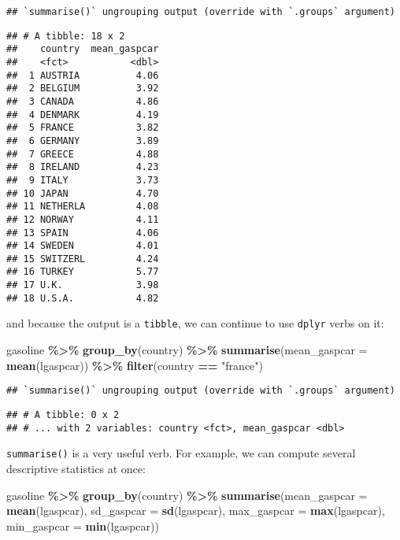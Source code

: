 \documentclass[
]{article}
\newenvironment{Shaded}{\begin{snugshade}}{\end{snugshade}}
\newcommand{\DataTypeTok}[1]{\textcolor[rgb]{0.13,0.29,0.53}{#1}}
\newcommand{\KeywordTok}[1]{\textcolor[rgb]{0.13,0.29,0.53}{\textbf{#1}}}
\newcommand{\NormalTok}[1]{#1}
\newcommand{\OperatorTok}[1]{\textcolor[rgb]{0.81,0.36,0.00}{\textbf{#1}}}
\newcommand{\StringTok}[1]{\textcolor[rgb]{0.31,0.60,0.02}{#1}}
\begin{document}
\begin{verbatim}
## `summarise()` ungrouping output (override with `.groups` argument)
\end{verbatim}

\begin{verbatim}
## # A tibble: 18 x 2
##    country  mean_gaspcar
##    <fct>           <dbl>
##  1 AUSTRIA          4.06
##  2 BELGIUM          3.92
##  3 CANADA           4.86
##  4 DENMARK          4.19
##  5 FRANCE           3.82
##  6 GERMANY          3.89
##  7 GREECE           4.88
##  8 IRELAND          4.23
##  9 ITALY            3.73
## 10 JAPAN            4.70
## 11 NETHERLA         4.08
## 12 NORWAY           4.11
## 13 SPAIN            4.06
## 14 SWEDEN           4.01
## 15 SWITZERL         4.24
## 16 TURKEY           5.77
## 17 U.K.             3.98
## 18 U.S.A.           4.82
\end{verbatim}

and because the output is a \texttt{tibble}, we can continue to use \texttt{dplyr} verbs on it:

\begin{Shaded}
\begin{Highlighting}[]
\NormalTok{gasoline }\OperatorTok{\%\textgreater{}\%}
\StringTok{  }\KeywordTok{group\_by}\NormalTok{(country) }\OperatorTok{\%\textgreater{}\%}
\StringTok{  }\KeywordTok{summarise}\NormalTok{(}\DataTypeTok{mean\_gaspcar =} \KeywordTok{mean}\NormalTok{(lgaspcar)) }\OperatorTok{\%\textgreater{}\%}
\StringTok{  }\KeywordTok{filter}\NormalTok{(country }\OperatorTok{==}\StringTok{ "france"}\NormalTok{)}
\end{Highlighting}
\end{Shaded}

\begin{verbatim}
## `summarise()` ungrouping output (override with `.groups` argument)
\end{verbatim}

\begin{verbatim}
## # A tibble: 0 x 2
## # ... with 2 variables: country <fct>, mean_gaspcar <dbl>
\end{verbatim}

\texttt{summarise()} is a very useful verb. For example, we can compute several descriptive statistics at once:

\begin{Shaded}
\begin{Highlighting}[]
\NormalTok{gasoline }\OperatorTok{\%\textgreater{}\%}
\StringTok{  }\KeywordTok{group\_by}\NormalTok{(country) }\OperatorTok{\%\textgreater{}\%}
\StringTok{  }\KeywordTok{summarise}\NormalTok{(}\DataTypeTok{mean\_gaspcar =} \KeywordTok{mean}\NormalTok{(lgaspcar),}
            \DataTypeTok{sd\_gaspcar =} \KeywordTok{sd}\NormalTok{(lgaspcar),}
            \DataTypeTok{max\_gaspcar =} \KeywordTok{max}\NormalTok{(lgaspcar),}
            \DataTypeTok{min\_gaspcar =} \KeywordTok{min}\NormalTok{(lgaspcar))}
\end{Highlighting}
\end{Shaded}
\end{document}
